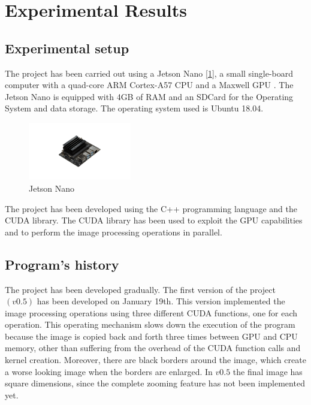 \section{Experimental Results}

    \subsection{Experimental setup}
    The project has been carried out using a Jetson Nano [\ref{fig:jetson}], a small single-board computer with a quad-core ARM Cortex-A57 CPU and a Maxwell GPU \cite{jetson_nano}. 
    The Jetson Nano is equipped with 4GB of RAM and an SDCard for the Operating System and data storage. The operating system used is Ubuntu 18.04. 

    \begin{figure}[h]
        \centering
        \includegraphics[width=0.4\textwidth]{img/jetson-nano.png}
        \caption{Jetson Nano}
        \label{fig:jetson}
    \end{figure}

    \noindent The project has been developed using the C++ programming language and the CUDA library. 
    The CUDA library has been used to exploit the GPU capabilities and to perform the image processing operations in parallel.

    \subsection{Program's history}
    The project has been developed gradually. The first version of the project $(v0.5)$ has been developed on January 19th. 
    This version implemented the image processing operations using three different CUDA functions, one for each operation. 
    This operating mechanism slows down the execution of the program because the image is copied back and forth three times between GPU and CPU memory,
    other than suffering from the overhead of the CUDA function calls and kernel creation.
    Moreover, there are black borders around the image, which create a worse looking image when the borders are enlarged.
    In $v0.5$ the final image has square dimensions, since the complete zooming feature has not been implemented yet.

